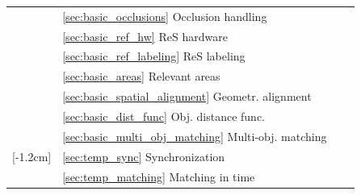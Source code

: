 \documentclass[conference]{IEEEtran}
\begin{document}
\begin{table}[htbp]
\begin{threeparttable}
\begin{tabularx}{\linewidth}{
			>{\hsize=0.02\hsize}X
			>{\hsize=0.38\hsize}X 
			>{\hsize=0.8\hsize}X 
			>{\hsize=0.8\hsize}X 
		}
		                                                                                        & \ref{sec:basic_occlusions} Occlusion handling             & \basicChallengeOcclusion             & \basicDroneOcclusion                                                            \\ \cline{2-4}
		                                                                                        & \ref{sec:basic_ref_hw} ReS hardware                       & \basicChallengeReSHW                 & \basicDroneReSHW                                                                \\ \cline{2-4}
		                                                                                        & \ref{sec:basic_ref_labeling} ReS labeling               & \basicChallengeReSLabling            & \basicDroneReSLabling                                                           \\ \cline{2-4}
		                                                                                        & \ref{sec:basic_areas} Relevant areas             & \basicChallengeAreas                 & \basicDroneAreas                                                                \\ \cline{2-4}
		                                                                                        & \ref{sec:basic_spatial_alignment} Geometr. alignment  & \basicChallengeGeometrAlign          & \basicDroneGeometrAlign                                                         \\ \cline{2-4}
		                                                                                        & \ref{sec:basic_dist_func} Obj. distance func.     & \basicChallengeObjDistance           & \basicDroneObjDistance                                                          \\ \cline{2-4}
		                                                                                        & \ref{sec:basic_multi_obj_matching} Multi-obj. matching & \basicChallengeMultiObjMatching      & \basicDroneMultiObjMatching                                                     \\ \midrule
		\parbox[t]{2mm}{[-1.2cm]{}}            & \ref{sec:temp_sync} Synchronization                 & \tempChallengeSync                   & \tempDroneSync                                                                  \\ 
		                                                                                        & \ref{sec:temp_matching} Matching in time                    & \tempChallengeMatching               & \tempDroneMatching                                                              \\ 

\end{tabularx}
\end{threeparttable}
\end{table}
\end{document}
